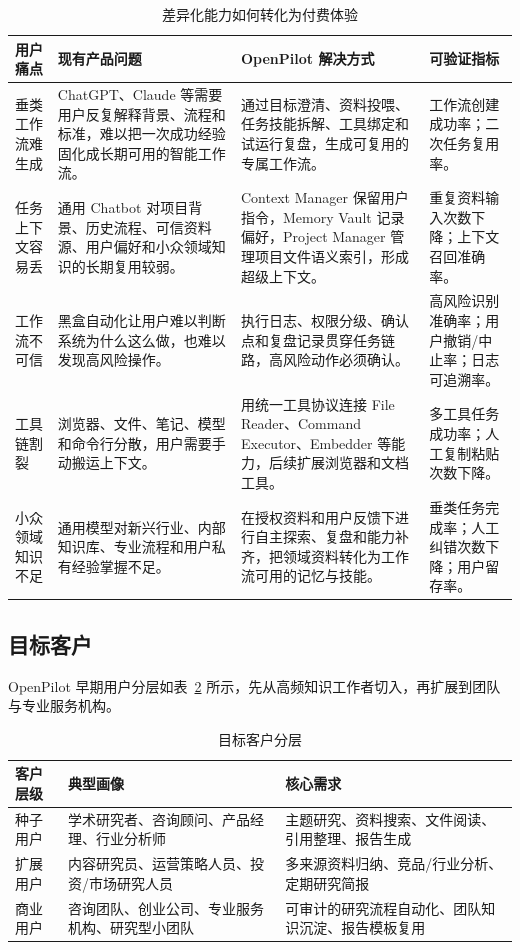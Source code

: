 \documentclass[12pt,a4paper]{ctexart}
\begin{document}
\begin{table}[htbp]
  \centering
  \small
  \begin{tabularx}{\textwidth}{p{2.5cm} X X p{2.8cm}}
    \toprule
    \textbf{用户痛点} & \textbf{现有产品问题} & \textbf{OpenPilot 解决方式} & \textbf{可验证指标} \\
    \midrule
    垂类工作流难生成 & ChatGPT、Claude 等需要用户反复解释背景、流程和标准，难以把一次成功经验固化成长期可用的智能工作流。 & 通过目标澄清、资料投喂、任务技能拆解、工具绑定和试运行复盘，生成可复用的专属工作流。 & 工作流创建成功率；二次任务复用率。 \\
    任务上下文容易丢 & 通用 Chatbot 对项目背景、历史流程、可信资料源、用户偏好和小众领域知识的长期复用较弱。 & Context Manager 保留用户指令，Memory Vault 记录偏好，Project Manager 管理项目文件语义索引，形成超级上下文。 & 重复资料输入次数下降；上下文召回准确率。 \\
    工作流不可信 & 黑盒自动化让用户难以判断系统为什么这么做，也难以发现高风险操作。 & 执行日志、权限分级、确认点和复盘记录贯穿任务链路，高风险动作必须确认。 & 高风险识别准确率；用户撤销/中止率；日志可追溯率。 \\
    工具链割裂 & 浏览器、文件、笔记、模型和命令行分散，用户需要手动搬运上下文。 & 用统一工具协议连接 File Reader、Command Executor、Embedder 等能力，后续扩展浏览器和文档工具。 & 多工具任务成功率；人工复制粘贴次数下降。 \\
    小众领域知识不足 & 通用模型对新兴行业、内部知识库、专业流程和用户私有经验掌握不足。 & 在授权资料和用户反馈下进行自主探索、复盘和能力补齐，把领域资料转化为工作流可用的记忆与技能。 & 垂类任务完成率；人工纠错次数下降；用户留存率。 \\
    \bottomrule
  \end{tabularx}
  \caption{差异化能力如何转化为付费体验}
  \label{tab:painpoint-metrics}
\end{table}


\subsection{目标客户}

OpenPilot 早期用户分层如表~\ref{tab:customers} 所示，先从高频知识工作者切入，再扩展到团队与专业服务机构。

\begin{table}[htbp]
  \centering
  \begin{tabularx}{\textwidth}{p{2.6cm} X X}
    \toprule
    \textbf{客户层级} & \textbf{典型画像} & \textbf{核心需求} \\
    \midrule
    种子用户 & 学术研究者、咨询顾问、产品经理、行业分析师 & 主题研究、资料搜索、文件阅读、引用整理、报告生成 \\
    扩展用户 & 内容研究员、运营策略人员、投资/市场研究人员 & 多来源资料归纳、竞品/行业分析、定期研究简报 \\
    商业用户 & 咨询团队、创业公司、专业服务机构、研究型小团队 & 可审计的研究流程自动化、团队知识沉淀、报告模板复用 \\
    \bottomrule
  \end{tabularx}
  \caption{目标客户分层}
  \label{tab:customers}
\end{table}
\end{document}
